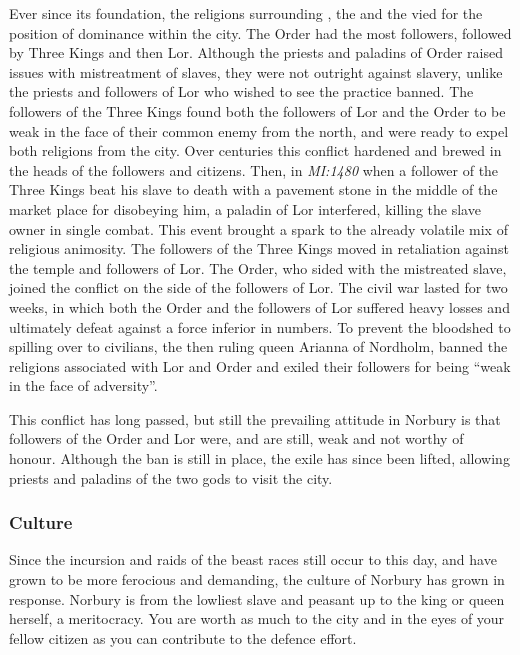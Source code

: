 Ever since its foundation, the religions surrounding , the
 and the  vied for the position of
dominance within the city. The Order had the most followers, followed by Three
Kings and then Lor. Although the priests and paladins of Order raised issues
with mistreatment of slaves, they were not outright against slavery, unlike
the priests and followers of Lor who wished to see the practice banned. The
followers of the Three Kings found both the followers of Lor and the Order to
be weak in the face of their common enemy from the north, and were ready to
expel both religions from the city. Over centuries this conflict hardened and
brewed in the heads of the followers and citizens. Then, in \emph{MI:1480}
when a follower of the Three Kings beat his slave to death with a pavement
stone in the middle of the market place for disobeying him, a paladin of Lor
interfered, killing the slave owner in single combat. This event brought a spark
to the already volatile mix of religious animosity. The followers of the Three
Kings moved in retaliation against the temple and followers of Lor. The
Order, who sided with the mistreated slave, joined the conflict on the side of
the followers of Lor. The civil war lasted for two weeks, in which both the
Order and the followers of Lor suffered heavy losses and ultimately defeat
against a force inferior in numbers. To prevent the bloodshed to spilling over
to civilians, the then ruling queen Arianna of Nordholm, banned the religions
associated with Lor and Order and exiled their followers for being ``weak in
the face of adversity''.

This conflict has long passed, but still the prevailing attitude in Norbury is
that followers of the Order and Lor were, and are still, weak and not worthy
of honour. Although the ban is still in place, the exile has since been
lifted, allowing priests and paladins of the two gods to visit the city.

\subsubsection{Culture}

Since the incursion and raids of the beast races still occur to this day,
and have grown to be more ferocious and demanding, the culture of Norbury
has grown in response. Norbury is from the lowliest slave and peasant up
to the king or queen herself, a meritocracy. You are worth as much to the
city and in the eyes of your fellow citizen as you can contribute to the
defence effort.

